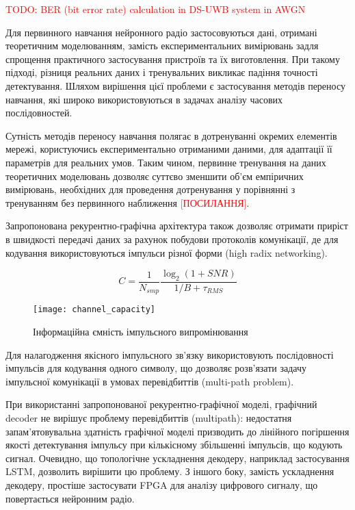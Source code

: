 \textcolor{red}{TODO: BER (bit error rate) calculation in DS-UWB system in AWGN}

Для первинного навчання нейронного радіо застосовуються дані, отримані 
теоретичним моделюванням, замість експериментальних вимірювань задля спрощення 
практичного застосування пристроїв та їх виготовлення. При такому підході,
різниця реальних даних і тренувальних викликає падіння точності детектування.
Шляхом вирішення цієї проблеми є застосування методів переносу навчання, які 
широко використовуються в задачах аналізу часових послідовностей. 

Сутність методів переносу навчання полягає в дотренуванні окремих елементів 
мережі, користуючись експериментально отриманими даними, для адаптації її 
параметрів для реальних умов. Таким чином, первинне тренування на даних
теоретичних моделювань дозволяє суттєво зменшити об'єм емпіричних вимірювань,
необхідних для проведення дотренування у порівнянні з тренуванням без 
первинного наближення \textcolor{red}{[ПОСИЛАННЯ]}.

Запропонована рекурентно-графічна архітектура також дозволяє отримати приріст 
в швидкості передачі даних за рахунок побудови протоколів комунікації, де для
кодування використовуються імпульси різної форми (high radix networking).

\begin{equation}
C = \frac{1}{N_{smp}} \frac{\log_2 \left( 1 + SNR \right)}{1/B + \tau_{RMS}} 
\end{equation}

\begin{figure}[htbp] \begin{center}
\texttt{[image: channel\_capacity]}
\caption{Інформаційна ємність імпульсного випромінювання} \label{fig:info_cap}
\end{center} \end{figure}

Для налагодження якісного імпульсного зв'язку використовують послідовності 
імпульсів для кодування одного символу, що дозволяє розв'язати задачу 
імпульсної комунікації в умовах перевідбиттів (multi-path problem).

При використанні запропонованої рекурентно-графічної моделі, графічний 
decoder не вирішує проблему перевідбиттів (multipath): недостатня 
запам'ятовувальна здатність графічної моделі призводить до лінійного 
погіршення якості детектування імпульсу при кількісному збільшенні імпульсів, 
що кодують сигнал. Очевидно, що топологічне ускладнення декодеру, наприклад 
застосування LSTM, дозволить вирішити цю проблему. З іншого боку, замість 
ускладнення декодеру, простіше застосувати FPGA для аналізу цифрового сигналу, 
що повертається нейронним радіо.

